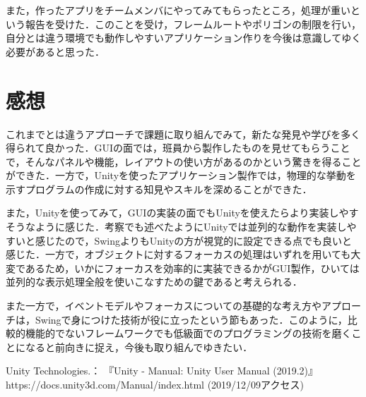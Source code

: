 \documentclass[12pt]{jarticle}
\begin{document}
また，作ったアプリをチームメンバにやってみてもらったところ，処理が重いという報告を受けた．このことを受け，フレームルートやポリゴンの制限を行い，自分とは違う環境でも動作しやすいアプリケーション作りを今後は意識してゆく必要があると思った．

\section{感想}
これまでとは違うアプローチで課題に取り組んでみて，新たな発見や学びを多く得られて良かった．GUIの面では，班員から製作したものを見せてもらうことで，そんなパネルや機能，レイアウトの使い方があるのかという驚きを得ることができた．一方で，Unityを使ったアプリケーション製作では，物理的な挙動を示すプログラムの作成に対する知見やスキルを深めることができた．

また，Unityを使ってみて，GUIの実装の面でもUnityを使えたらより実装しやすそうなように感じた．考察でも述べたようにUnityでは並列的な動作を実装しやすいと感じたので，SwingよりもUnityの方が視覚的に設定できる点でも良いと感じた．一方で，オブジェクトに対するフォーカスの処理はいずれを用いても大変であるため，いかにフォーカスを効率的に実装できるかがGUI製作，ひいては並列的な表示処理全般を使いこなすための鍵であると考えられる．

また一方で，イベントモデルやフォーカスについての基礎的な考え方やアプローチは，Swingで身につけた技術が役に立ったという節もあった．このように，比較的機能的でないフレームワークでも低級面でのプログラミングの技術を磨くことになると前向きに捉え，今後も取り組んでゆきたい．

\begin{thebibliography}{99}
Unity Technologies.： 『Unity - Manual: Unity User Manual (2019.2)』 https://docs.unity3d.com/Manual/index.html (2019/12/09アクセス) \\
\end{thebibliography}
\end{document}
